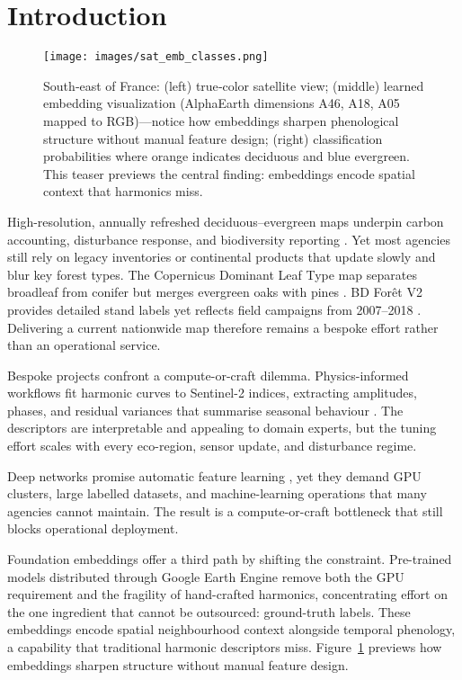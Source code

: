 \documentclass[utf8]{FrontiersinHarvard}
\begin{document}
\section{Introduction}

\begin{figure}[H]
    \centering
    \texttt{[image: images/sat\_emb\_classes.png]}
    \caption{South‑east of France: (left) true‑color satellite view; (middle) learned embedding visualization (AlphaEarth dimensions A46, A18, A05 mapped to RGB)—notice how embeddings sharpen phenological structure without manual feature design; (right) classification probabilities where orange indicates deciduous and blue evergreen. This teaser previews the central finding: embeddings encode spatial context that harmonics miss.}
    \label{fig:teaser_sat_emb_class}
\end{figure}

High-resolution, annually refreshed deciduous–evergreen maps underpin carbon accounting, disturbance response, and biodiversity reporting \citep{Zhu2014,Zhao2019,Verbesselt2010a,Verbesselt2010b,Kennedy2010,Kennedy2018}. Yet most agencies still rely on legacy inventories or continental products that update slowly and blur key forest types. The Copernicus Dominant Leaf Type map separates broadleaf from conifer but merges evergreen oaks with pines \citep{EU2024a}. BD Forêt V2 provides detailed stand labels yet reflects field campaigns from 2007–2018 \citep{IGN2024}. Delivering a current nationwide map therefore remains a bespoke effort rather than an operational service.

Bespoke projects confront a compute-or-craft dilemma. Physics-informed workflows fit harmonic curves to Sentinel-2 indices, extracting amplitudes, phases, and residual variances that summarise seasonal behaviour \citep{Inglada2017,Li2023,Bolton2020}. The descriptors are interpretable and appealing to domain experts, but the tuning effort scales with every eco-region, sensor update, and disturbance regime.

Deep networks promise automatic feature learning \citep{Low2020,Xie2024FoundationEffective}, yet they demand GPU clusters, large labelled datasets, and machine-learning operations that many agencies cannot maintain. The result is a compute-or-craft bottleneck that still blocks operational deployment.

Foundation embeddings offer a third path by shifting the constraint. Pre-trained models distributed through Google Earth Engine remove both the GPU requirement and the fragility of hand-crafted harmonics, concentrating effort on the one ingredient that cannot be outsourced: ground-truth labels. These embeddings encode spatial neighbourhood context alongside temporal phenology, a capability that traditional harmonic descriptors miss. Figure~\ref{fig:teaser_sat_emb_class} previews how embeddings sharpen structure without manual feature design.
\end{document}
